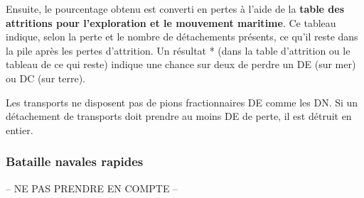 %

Ensuite, le pourcentage obtenu est converti en pertes à l'aide de
la \textbf{table des attritions pour l'exploration et le mouvement maritime}.
Ce tableau indique, selon la perte et le nombre de détachements présents,
ce qu'il reste dans la pile après les pertes d'attrition. Un résultat * (dans la table 
d'attrition ou le tableau de ce qui reste) indique une chance sur deux de perdre un DE
(sur mer) ou DC (sur terre).

Les transports ne disposent pas de pions fractionnaires DE comme les DN.
Si un détachement de transports doit prendre au moins DE de perte, 
il est détruit en entier.


\subsubsection{Bataille navales rapides}
-- NE PAS PRENDRE EN COMPTE --

